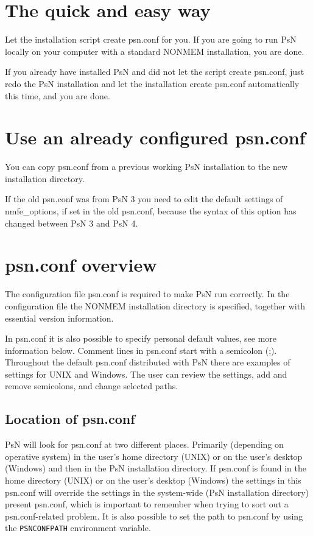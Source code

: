 
\usepackage{hyperref}


\maketitle
\tableofcontents
\newpage

\section{The quick and easy way}
Let the installation script create psn.conf for you. If you are going to run PsN locally on your computer with a standard NONMEM installation, you are done.

If you already have installed PsN and did not let the script create psn.conf, just redo the PsN installation and let the installation create psn.conf automatically this time, and you are done.

\section{Use an already configured psn.conf}
You can copy psn.conf from a previous working PsN installation to the new installation directory. 

If the old psn.conf was from PsN 3 you need to edit the default settings of nmfe\_options, if set in the old psn.conf, because the syntax of this option has changed between PsN 3 and PsN 4.

\section{psn.conf overview}
The configuration file psn.conf is required to make PsN run correctly. In the configuration file the NONMEM installation directory is specified, together with essential version information. 

In psn.conf it is also possible to specify personal default values, see more information below. Comment lines in psn.conf start with a semicolon (;). Throughout the default psn.conf distributed with PsN there are examples of settings for UNIX and Windows. The user can review the settings, add and remove semicolons, and change selected paths.

\subsection{Location of psn.conf}
PsN will look for psn.conf at two different places. Primarily (depending on operative system) in the user's home directory (UNIX) or on the user's desktop (Windows) and then in the PsN installation directory. If psn.conf is found in the home directory (UNIX) or on the user's desktop (Windows) the settings in this psn.conf will override the settings in the system-wide (PsN installation directory) present psn.conf, which is important to remember when trying to sort out a psn.conf-related problem. It is also possible to set the path to psn.conf by using the \verb|PSNCONFPATH| environment variable.

